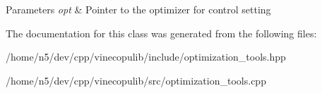 \begin{DoxyParams}{Parameters}
{\em opt} & Pointer to the optimizer for control setting \\
\hline
\end{DoxyParams}


The documentation for this class was generated from the following files\+:\begin{DoxyCompactItemize}
\item 
/home/n5/dev/cpp/vinecopulib/include/optimization\+\_\+tools.\+hpp\item 
/home/n5/dev/cpp/vinecopulib/src/optimization\+\_\+tools.\+cpp\end{DoxyCompactItemize}
